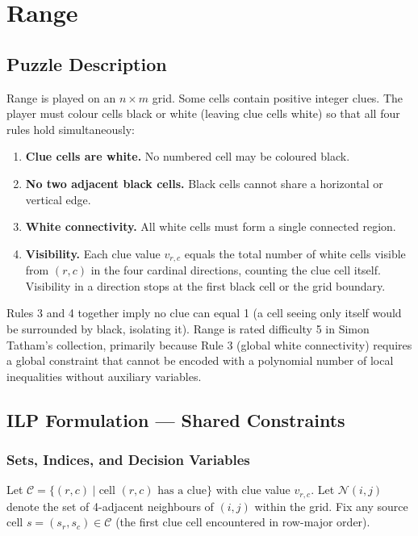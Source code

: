 \section{Range}
\label{sec:range}

\subsection{Puzzle Description}

Range is played on an $n \times m$ grid. Some cells contain positive integer clues. The player must colour cells black or white (leaving clue cells white) so that all four rules hold simultaneously:

\begin{enumerate}
  \item \textbf{Clue cells are white.} No numbered cell may be coloured black.
  \item \textbf{No two adjacent black cells.} Black cells cannot share a horizontal or vertical edge.
  \item \textbf{White connectivity.} All white cells must form a single connected region.
  \item \textbf{Visibility.} Each clue value $v_{r,c}$ equals the total number of white cells visible from $(r,c)$ in the four cardinal directions, counting the clue cell itself. Visibility in a direction stops at the first black cell or the grid boundary.
\end{enumerate}

Rules 3 and 4 together imply no clue can equal 1 (a cell seeing only itself would be surrounded by black, isolating it). Range is rated difficulty 5 in Simon Tatham's collection, primarily because Rule 3 (global white connectivity) requires a global constraint that cannot be encoded with a polynomial number of local inequalities without auxiliary variables.

\subsection{ILP Formulation — Shared Constraints}

\subsubsection{Sets, Indices, and Decision Variables}

Let $\mathcal{C} = \{(r,c) \mid \text{cell } (r,c) \text{ has a clue}\}$ with clue value $v_{r,c}$. Let $\mathcal{N}(i,j)$ denote the set of 4-adjacent neighbours of $(i,j)$ within the grid. Fix any source cell $s = (s_r, s_c) \in \mathcal{C}$ (the first clue cell encountered in row-major order).

